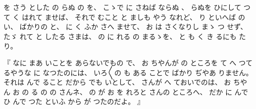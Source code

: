 を
さう
とした
の
らぬ
の
を、
%
こゝで
に
さねば
ならぬ
、
%
らぬを
ひにして
つて
く
はれて
ませば、
%
それで
むこと%
%
と
ましも
やう
なれど、
%
り
といへば
の
い、
%
ばかりの
と、
%
に
く
ふか
さへ
ませて、
%
お
は
さくなりし
まゝ
つ
せず、
%
たゞ
れて
と
したる
さまは、
%
の
%
に
れる
の
まるゝを、
%
と
も
く
き
るにも
たり。

%
『
なに
まあ
いことを
あらないでもの
で、
%
お
ちやんが
の
ところを
て
へ
つて
るやうな
に
なつたのには、
%
いろ〳〵の
も
ある
ことで
ばかり
ぢやあ
りません。
%
%
それは
んで
ること
だから
でも
いとして、
%
さんが
へ
ておいでのは、
%
お
ちやん
お
の
る
の
の
%
さんネ、
%
の
が
お
を
れろと
さんの
ところへ、
%
だか
に
んで
ひ
んで
つた
といふ
から
が
つたのだよ。
』

